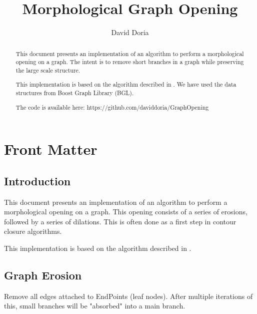 \documentclass{InsightArticle}
\title{Morphological Graph Opening}
\author{David Doria}
\newcommand{\IJhandlerIDnumber}{3250}
\begin{document}
\IJhandlefooter{\IJhandlerIDnumber}


\ifpdf
\else
\fi


\maketitle


\ifhtml
\chapter*{Front Matter\label{front}}
\fi

\begin{abstract}
\noindent

This document presents an implementation of an algorithm to perform a morphological opening on a graph. The intent is to remove short branches in a graph while preserving the large scale structure.

This implementation is based on the algorithm described in \cite{Sappa}. We have used the data structures from Boost Graph Library (BGL).

The code is available here:
https://github.com/daviddoria/GraphOpening

\end{abstract}

\IJhandlenote{\IJhandlerIDnumber}

\tableofcontents
\section{Introduction}
This document presents an implementation of an algorithm to perform a morphological opening on a graph. This opening consists of a series of erosions, followed by a series of dilations. This is often done as a first step in contour closure algorithms.

This implementation is based on the algorithm described in \cite{Sappa}.

\section{Graph Erosion}
Remove all edges attached to EndPoints (leaf nodes). After multiple iterations of this, small branches
will be "absorbed" into a main branch.
\end{document}
